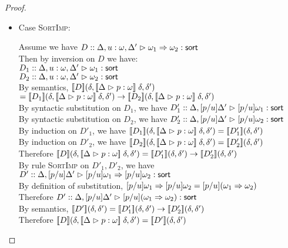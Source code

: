 \begin{proof}
\begin{enumerate}
\begin{itemize}
    \item Case \textsc{SortImp}: 
      \begin{tabbedproof}
        \oo Assume we have $D :: \judgeSort[{\Delta, u:\omega, \Delta'}]{\omega_1 \To \omega_2}$ \\
        \ooo Then by inversion on $D$ we have:\\
        \oooo $D_1 :: \judgeSort[{\Delta, u:\omega, \Delta'}]{\omega_1}$ \\
        \oooo $D_2 :: \judgeSort[{\Delta, u:\omega, \Delta'}]{\omega_2}$ \\
        \ooo By semantics, $\interp{D}(\delta, \interp{\judgeA{p}{\omega}}\;\delta, \delta')$\\
        \ooox $= \interp{D_1}(\delta, \interp{\judgeA{p}{\omega}}\;\delta, \delta')
                 \to
                  \interp{D_2}(\delta, \interp{\judgeA{p}{\omega}}\;\delta, \delta')$\\
        \ooo By syntactic substitution on $D_1$, we have
               $D'_1 :: \judgeSort[{\Delta, [p/u]\Delta'}]{[p/u]\omega_1}$ \\
        \ooo By syntactic substitution on $D_2$, we have
               $D'_2 :: \judgeSort[{\Delta, [p/u]\Delta'}]{[p/u]\omega_2}$ \\
        \ooo By induction on $D'_1$, we have 
              $\interp{D_1}(\delta, \interp{\judgeA{p}{\omega}}\;\delta, \delta') = 
               \interp{D'_1}(\delta, \delta')$ \\
        \ooo By induction on $D'_2$, we have 
              $\interp{D_2}(\delta, \interp{\judgeA{p}{\omega}}\;\delta, \delta') = 
               \interp{D'_2}(\delta, \delta')$ \\
        \ooo Therefore $\interp{D}(\delta, \interp{\judgeA{p}{\omega}}\;\delta, \delta') = 
                         \interp{D'_1}(\delta, \delta') \to 
                         \interp{D'_2}(\delta, \delta')$ \\
        \ooo By rule \textsc{SortImp} on $D'_1, D'_2$, we have 
              $D' :: \judgeSort[{\Delta, [p/u]\Delta'}]{[p/u]\omega_1 \To [p/u]\omega_2}$ \\
        \ooo By definition of substitution, $[p/u]\omega_1 \To [p/u]\omega_2 = [p/u](\omega_1 \To \omega_2)$ \\
        \ooo Therefore $D' :: \judgeSort[{\Delta, [p/u]\Delta'}]{[p/u](\omega_1 \To \omega_2)}$ \\
        \ooo By semantics, 
              $\interp{D'}(\delta, \delta') = \interp{D'_1}(\delta, \delta') \to 
                                              \interp{D'_2}(\delta, \delta')$ \\
        \ooo Therefore $\interp{D}(\delta, \interp{\judgeA{p}{\omega}}\;\delta, \delta') 
                        = \interp{D'}(\delta,\delta')$ \\
      \end{tabbedproof}


\end{itemize}
\end{enumerate}
\end{proof}
